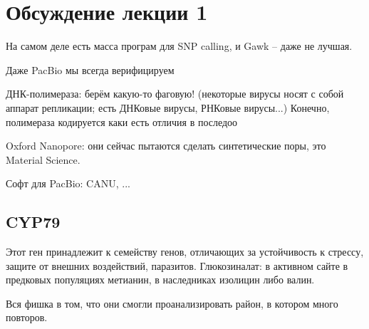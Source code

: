 \documentclass[main.tex]{subfiles}
\begin{document}
\section{Обсуждение лекции 1}

На самом деле есть масса програм для SNP calling, и Gawk -- даже не лучшая.

Даже PacBio мы всегда верифицируем

ДНК-полимераза: берём какую-то фаговую!
(некоторые вирусы носят с собой аппарат репликации; есть ДНКовые вирусы, РНКовые вирусы...)
Конечно, полимераза кодируется каки есть отличия в последоо

Oxford Nanopore: они сейчас пытаются сделать синтетические поры, это Material Science.

Софт для PacBio: CANU, ...

\subsection{CYP79}
Этот ген принадлежит к семейству генов, отличающих за устойчивость к стрессу, защите от внешних воздействий, паразитов.
Глюкозиналат: в активном сайте в предковых популяциях метианин, в наследниках изолицин либо валин.

Вся фишка в том, что они смогли проанализировать район, в котором много повторов.
\end{document}
